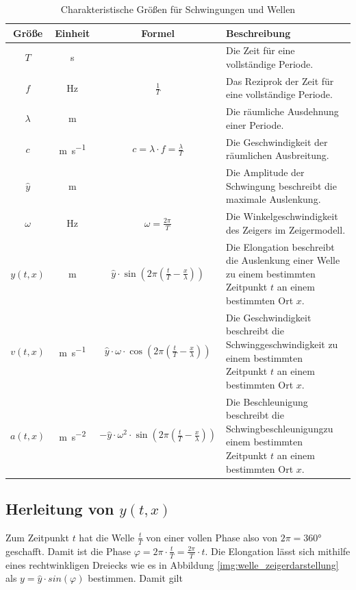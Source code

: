 \documentclass[a4paper]{article}
\begin{document}
	
			\begin{table}[H]
				\def\arraystretch{1.5}
				 \begin{tabularx}{\textwidth}{|c|c|c|X|}\hline
					Größe & Einheit & Formel & Beschreibung \\\hline
					$T$ & \si{\second} & & Die Zeit für eine vollständige Periode.\\\hline
					$f$ & \si{\hertz}  & $\frac{1}{T}$ & Das Reziprok der Zeit für eine vollständige Periode.\\\hline
					$\lambda$ & \si{\meter} & & Die räumliche Ausdehnung einer Periode.\\\hline
					$c$ & \si{\meter\per\second} & $c=\lambda\cdot f = \frac{\lambda}{T}$ & Die Geschwindigkeit der räumlichen Ausbreitung.\\\hline
					$\hat{y}$ & \si{\meter}& & Die Amplitude der Schwingung beschreibt die maximale Auslenkung.\\\hline
					$\omega$ & \si{\hertz} & $\omega=\frac{2\pi}{T}$ & Die Winkelgeschwindigkeit des Zeigers im Zeigermodell.\\\hline
					$y(t, x)$ & \si{\meter} & $\hat{y}\cdot\sin\left(2\pi\left(\frac{t}{T}-\frac{x}{\lambda} \right)\right)$ & Die Elongation beschreibt die Auslenkung einer Welle zu einem bestimmten Zeitpunkt $t$ an einem bestimmten Ort $x$.\\\hline
					$v(t, x)$ & \si{\meter\per\second} & $\hat{y}\cdot\omega\cdot\cos\left(2\pi\left(\frac{t}{T}-\frac{x}{\lambda} \right)\right)$ & Die Geschwindigkeit beschreibt die Schwinggeschwindigkeit zu einem bestimmten Zeitpunkt $t$ an einem bestimmten Ort $x$.\\\hline
					$a(t, x)$ & \si{\meter\per\second\squared} & $-\hat{y}\cdot\omega^2\cdot\sin\left(2\pi\left(\frac{t}{T}-\frac{x}{\lambda} \right)\right)$ & Die Beschleunigung beschreibt die Schwingbeschleunigungzu einem bestimmten Zeitpunkt $t$ an einem bestimmten Ort $x$.\\\hline
				\end{tabularx}
				\caption {Charakteristische Größen für Schwingungen und Wellen}
				\label{table:wellen_grossen}
			\end{table}	
	
		\subsection{Herleitung von $y(t, x)$}
			Zum Zeitpunkt $t$ hat die Welle $\frac{t}{T}$ von einer vollen Phase also von $2\pi = 360\si{\degree}$ geschafft. Damit ist die Phase $\varphi = 2\pi\cdot\frac{t}{T} = \frac{2\pi}{T}\cdot t$. Die Elongation lässt sich mithilfe eines rechtwinkligen Dreiecks wie es in Abbildung \ref{img:welle_zeigerdarstellung} als $y=\hat{y}\cdot sin\left(\varphi\right)$ bestimmen. Damit gilt
			
\end{document}
